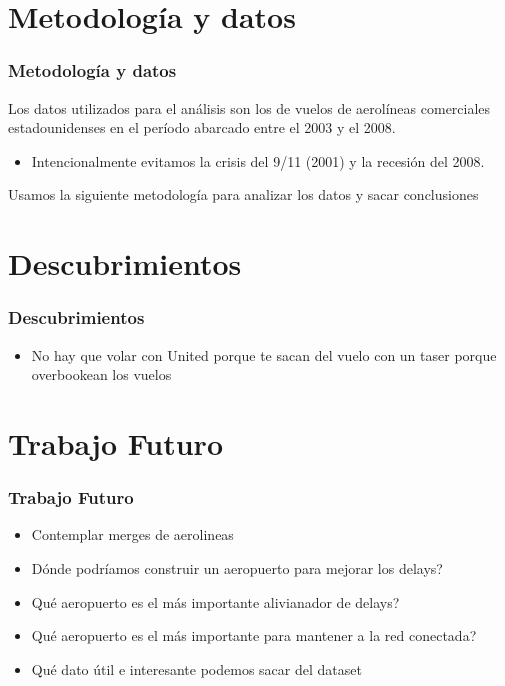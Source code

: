 \documentclass{beamer}
\begin{document}
\section{Metodología y datos}
\begin{frame}
\frametitle{Metodología y datos}
Los datos utilizados para el análisis son los de vuelos de aerolíneas comerciales estadounidenses en el período abarcado entre el 2003 y el 2008.
\begin{itemize}
\item Intencionalmente evitamos la crisis del 9/11 (2001) y la recesión del 2008.
\end{itemize}
Usamos la siguiente metodología para analizar los datos y sacar conclusiones
\end{frame}

\section{Descubrimientos}
\begin{frame}
\frametitle{Descubrimientos}
\begin{itemize}
\item No hay que volar con United porque te sacan del vuelo con un taser porque overbookean los vuelos
\end{itemize}

\end{frame}

\section{Trabajo Futuro}
\begin{frame}
\frametitle{Trabajo Futuro}
\begin{itemize}
\item Contemplar merges de aerolineas
\item Dónde podríamos construir un aeropuerto para mejorar los delays?
\item Qué aeropuerto es el más importante alivianador de delays?
\item Qué aeropuerto es el más importante para mantener a la red conectada?
\item Qué dato útil e interesante podemos sacar del dataset
\end{itemize}
\end{frame}
\end{document}
